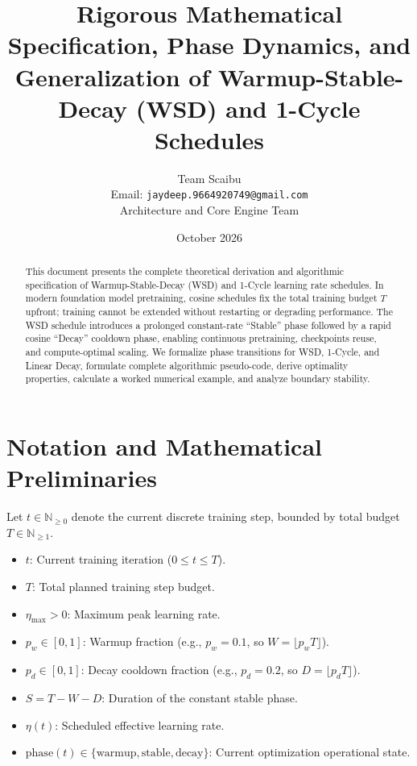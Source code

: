 \documentclass[11pt,a4paper]{article}
\title{\textbf{Rigorous Mathematical Specification, Phase Dynamics, and Generalization of Warmup-Stable-Decay (WSD) and 1-Cycle Schedules}}
\author{Team Scaibu \\ \small Email: \texttt{jaydeep.9664920749@gmail.com} \\ \small Architecture and Core Engine Team}
\date{October 2026}
\theoremstyle{definition}
\begin{document}
\maketitle

\begin{abstract}
This document presents the complete theoretical derivation and algorithmic specification of Warmup-Stable-Decay (WSD) and 1-Cycle learning rate schedules. In modern foundation model pretraining, cosine schedules fix the total training budget $T$ upfront; training cannot be extended without restarting or degrading performance. The WSD schedule introduces a prolonged constant-rate ``Stable'' phase followed by a rapid cosine ``Decay'' cooldown phase, enabling continuous pretraining, checkpoints reuse, and compute-optimal scaling. We formalize phase transitions for WSD, 1-Cycle, and Linear Decay, formulate complete algorithmic pseudo-code, derive optimality properties, calculate a worked numerical example, and analyze boundary stability.
\end{abstract}

\section{Notation and Mathematical Preliminaries}

Let $t \in \mathbb{N}_{\ge 0}$ denote the current discrete training step, bounded by total budget $T \in \mathbb{N}_{\ge 1}$.

\begin{itemize}
    \item $t$: Current training iteration ($0 \le t \le T$).
    \item $T$: Total planned training step budget.
    \item $\eta_{\max} > 0$: Maximum peak learning rate.
    \item $p_w \in [0, 1]$: Warmup fraction (e.g., $p_w = 0.1$, so $W = \lfloor p_w T \rfloor$).
    \item $p_d \in [0, 1]$: Decay cooldown fraction (e.g., $p_d = 0.2$, so $D = \lfloor p_d T \rfloor$).
    \item $S = T - W - D$: Duration of the constant stable phase.
    \item $\eta(t)$: Scheduled effective learning rate.
    \item $\text{phase}(t) \in \{\text{warmup}, \text{stable}, \text{decay}\}$: Current optimization operational state.
\end{itemize}
\end{document}
